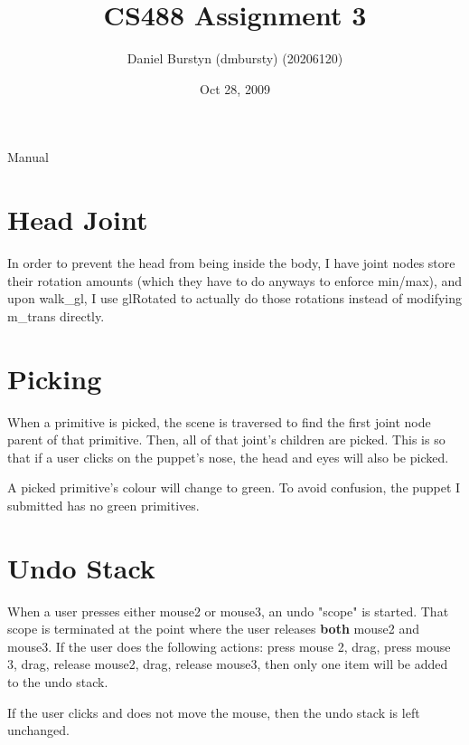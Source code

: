 \documentclass[12pt]{article}
\title{CS488 Assignment 3}
\author{Daniel Burstyn (dmbursty) (20206120)}
\date{Oct 28, 2009}
\begin{document}
\begin{titlepage}
\maketitle
\thispagestyle{empty}
\end{titlepage}
\newpage

\begin{center}
\begin{Huge}
Manual
\end{Huge}
\end{center}

\section{Head Joint}
In order to prevent the head from being inside the body, I have joint nodes
store their rotation amounts (which they have to do anyways to enforce min/max),
and upon walk\_gl, I use glRotated to actually do those rotations instead of
modifying m\_trans directly.

\section{Picking}
When a primitive is picked, the scene is traversed to find the first joint node
parent of that primitive.  Then, all of that joint's children are picked.  This
is so that if a user clicks on the puppet's nose, the head and eyes will also be
picked.

A picked primitive's colour will change to green.  To avoid confusion, the
puppet I submitted has no green primitives.

\section{Undo Stack}
When a user presses either mouse2 or mouse3, an undo "scope" is started.  That
scope is terminated at the point where the user releases \textbf{both} mouse2 and
mouse3.  If the user does the following actions: press mouse 2, drag, press
mouse 3, drag, release mouse2, drag, release mouse3, then only one item will be
added to the undo stack.

If the user clicks and does not move the mouse, then the undo stack is left
unchanged.
\end{document}
